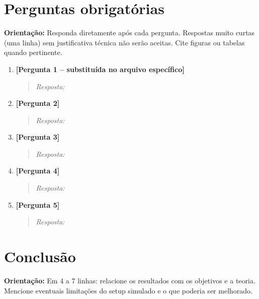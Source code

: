 \documentclass[12pt,a4paper]{article}
\newcommand{\dica}[1]{%
  \par\vspace{0.3em}%
  \noindent\colorbox{gray!15}{\parbox{0.97\linewidth}{\small\textbf{Orientação:} #1}}%
  \par\vspace{0.3em}%
}
\begin{document}
\vspace{5cm}

\section{Perguntas obrigatórias}
\dica{Responda diretamente após cada pergunta. Respostas muito curtas (uma
linha) sem justificativa técnica não serão aceitas. Cite figuras ou tabelas
quando pertinente.}

\begin{enumerate}[leftmargin=*, label=\textbf{Q\arabic*.}]

  \item \textbf{[Pergunta 1 -- substituída no arquivo específico]}
  \begin{quote}\textit{Resposta:}\end{quote}
  \vspace{1.8cm}

  \item \textbf{[Pergunta 2]}
  \begin{quote}\textit{Resposta:}\end{quote}
  \vspace{1.8cm}

  \item \textbf{[Pergunta 3]}
  \begin{quote}\textit{Resposta:}\end{quote}
  \vspace{1.8cm}

  \item \textbf{[Pergunta 4]}
  \begin{quote}\textit{Resposta:}\end{quote}
  \vspace{1.8cm}

  \item \textbf{[Pergunta 5]}
  \begin{quote}\textit{Resposta:}\end{quote}
  \vspace{1.8cm}

\end{enumerate}

\section{Conclusão}
\dica{Em 4 a 7 linhas: relacione os resultados com os objetivos e a teoria.
Mencione eventuais limitações do setup simulado e o que poderia ser
melhorado.}
\end{document}
